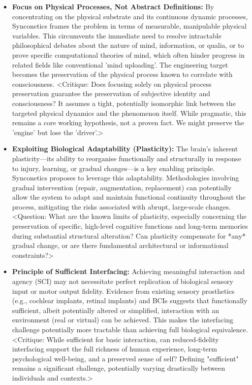 \documentclass[10pt]{article}
\begin{document}
\begin{sloppypar}
\begin{itemize}
    \item \textbf{Focus on Physical Processes, Not Abstract Definitions:} By concentrating on the physical substrate and its continuous dynamic processes, Synconetics frames the problem in terms of measurable, manipulable physical variables. This circumvents the immediate need to resolve intractable philosophical debates about the nature of mind, information, or qualia, or to prove specific computational theories of mind, which often hinder progress in related fields like conventional 'mind uploading'. The engineering target becomes the preservation of the physical process known to correlate with consciousness. <Critique: Does focusing solely on physical process preservation guarantee the preservation of subjective identity and consciousness? It assumes a tight, potentially isomorphic link between the targeted physical dynamics and the phenomenon itself. While pragmatic, this remains a core working hypothesis, not a proven fact. We might preserve the 'engine' but lose the 'driver'.>

    \item \textbf{Exploiting Biological Adaptability (Plasticity):} The brain's inherent plasticity—its ability to reorganise functionally and structurally in response to injury, learning, or gradual changes—is a key enabling principle. Synconetics proposes to leverage this adaptability. Methodologies involving gradual intervention (repair, augmentation, replacement) can potentially allow the system to adapt and maintain functional continuity throughout the process, mitigating the risks associated with abrupt, large-scale changes. <Question: What are the known limits of plasticity, especially concerning the preservation of specific, high-level cognitive functions and long-term memories during substantial structural alteration? Can plasticity compensate for *any* gradual change, or are there fundamental architectural or informational constraints?>

    \item \textbf{Principle of Sufficient Interfacing:} Achieving meaningful interaction and agency (SCI) may not necessitate perfect replication of biological sensory input or motor output fidelity. Evidence from existing sensory prosthetics (e.g., cochlear implants, retinal implants) and BCIs suggests that functionally sufficient, albeit potentially altered or simplified, interaction with an environment (real or virtual) can be achieved. This makes the interfacing challenge potentially more tractable than achieving full biological equivalence. <Critique: While sufficient for basic interaction, can reduced-fidelity interfacing support the full richness of human experience, long-term psychological well-being, and a preserved sense of self? Defining "sufficient" remains a significant challenge, potentially varying drastically between individuals and contexts.>


\end{itemize}
\end{sloppypar}
\end{document}
